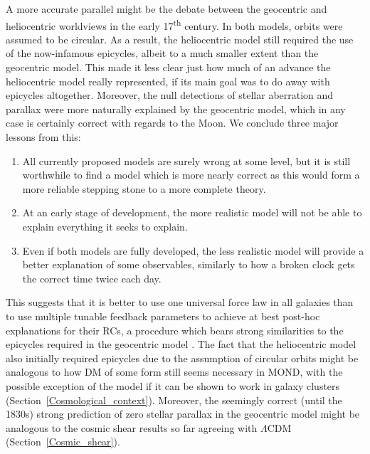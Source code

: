 \documentclass[fleqn,usenatbib,useAMS,onecolumn]{mnras} %
\begin{document}
A more accurate parallel might be the debate between the geocentric and heliocentric worldviews in the early 17\textsuperscript{th} century. In both models, orbits were assumed to be circular. As a result, the heliocentric model still required the use of the now-infamous epicycles, albeit to a much smaller extent than the geocentric model. This made it less clear just how much of an advance the heliocentric model really represented, if its main goal was to do away with epicycles altogether. Moreover, the null detections of stellar aberration and parallax were more naturally explained by the geocentric model, which in any case is certainly correct with regards to the Moon. We conclude three major lessons from this:
\begin{enumerate}
	\item All currently proposed models are surely wrong at some level, but it is still worthwhile to find a model which is more nearly correct as this would form a more reliable stepping stone to a more complete theory.
	\item At an early stage of development, the more realistic model will not be able to explain everything it seeks to explain.
	\item Even if both models are fully developed, the less realistic model will provide a better explanation of some observables, similarly to how a broken clock gets the correct time twice each day.
\end{enumerate}

This suggests that it is better to use one universal force law in all galaxies than to use multiple tunable feedback parameters to achieve at best post-hoc explanations for their RCs, a procedure which bears strong similarities to the epicycles required in the geocentric model \citep{Merritt_2020}. The fact that the heliocentric model also initially required epicycles due to the assumption of circular orbits might be analogous to how DM of some form still seems necessary in MOND, with the possible exception of the \citet{Skordis_2021} model if it can be shown to work in galaxy clusters (Section~\ref{Cosmological_context}). Moreover, the seemingly correct (until the 1830s) strong prediction of zero stellar parallax in the geocentric model might be analogous to the cosmic shear results so far agreeing with $\Lambda$CDM (Section~\ref{Cosmic_shear}).
\end{document}
